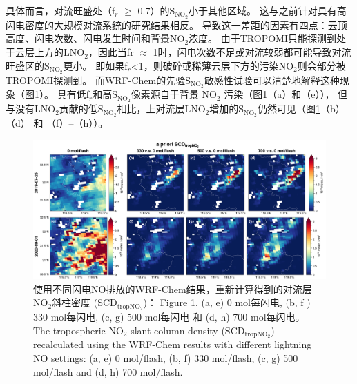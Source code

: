 具体而言，对流旺盛处（f$_r$ $\geq$ 0.7）的S$_{\textrm{NO$_2$}}$小于其他区域。
这与之前针对具有高闪电密度的大规模对流系统的研究结果相反\citep{Beirle.2009}。
导致这一差距的因素有四点：云顶高度、闪电次数、闪电发生时间和背景NO$_2$浓度。
由于TROPOMI只能探测到处于云层上方的LNO$_2$，因此当fr $\approx$ 1时，闪电次数不足或对流较弱都可能导致对流旺盛区的S$_{\textrm{NO$_2$}}$更小。
即如果f$_r$<1，则破碎或稀薄云层下方的污染NO$_2$则会部分被TROPOMI探测到。
而WRF-Chem的先验S$_{\textrm{NO$_2$}}$敏感性试验可以清楚地解释这种现象（图\ref{fig:s5p_apriori_scd}）。
具有低f$_r$和高S$_{\textrm{NO$_2$}}$像素源自于背景 NO$_2$ 污染（图\ref{fig:s5p_apriori_scd}（a）和（e）），
但与没有LNO$_2$贡献的低S$_{\textrm{NO$_2$}}$相比，上对流层LNO$_2$增加的S$_{\textrm{NO$_2$}}$仍然可见（图\ref{fig:s5p_apriori_scd}（b）--（d） 和 （f）--（h））。

\begin{figure}[!htbp]
    \includegraphics[width=17cm]{./figures/s5p_apriori_scd.png}
    \caption{使用不同闪电NO排放的WRF-Chem结果，重新计算得到的对流层NO$_2$斜柱密度 (SCD$_\textrm{tropNO$_2$}$)：
    Figure \ref{fig:s5p_apriori_scd}. (a, e) 0 mol每闪电, (b, f ) 330 mol每闪电, (c, g) 500 mol每闪电 和 (d, h) 700 mol每闪电。\\
    The tropospheric NO$_2$ slant column density (SCD$_\textrm{tropNO$_2$}$) recalculated using the WRF-Chem results with different lightning NO settings: (a, e) 0 mol/flash, (b, f) 330 mol/flash, (c, g) 500 mol/flash and (d, h) 700 mol/flash.
    }
    \label{fig:s5p_apriori_scd}
\end{figure}


